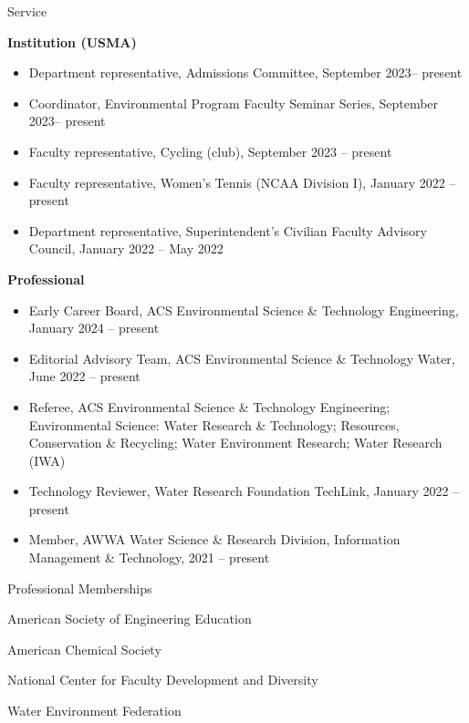 \documentclass{resume} %
\begin{document}
\begin{rSection}{Service}

\textbf{Institution (USMA)}
\begin{itemize}
\item Department representative, Admissions Committee, September 2023– present
\item Coordinator, Environmental Program Faculty Seminar Series, September 2023– present
\item Faculty representative, Cycling (club), September 2023 – present
\item Faculty representative, Women's Tennis (NCAA Division I), January 2022 – present
\item Department representative, Superintendent's Civilian Faculty Advisory Council, January 2022 – May 2022
\end{itemize}

\textbf{Professional}

\begin{itemize}
\item Early Career Board, ACS Environmental Science \& Technology Engineering, January 2024 – present
\item Editorial Advisory Team, ACS Environmental Science \& Technology Water, June 2022 – present
\item Referee, ACS Environmental Science \& Technology Engineering; Environmental Science: Water Research \& Technology; Resources, Conservation \& Recycling; Water Environment Research; Water Research (IWA)
\item Technology Reviewer, Water Research Foundation TechLink, January 2022 – present
\item Member, AWWA Water Science \& Research Division, Information Management \& Technology, 2021 – present
\end{itemize}

\end{rSection}

\begin{rSection}{Professional Memberships}

American Society of Engineering Education

American Chemical Society

National Center for Faculty Development and Diversity

Water Environment Federation

\end{rSection}
\end{document}
